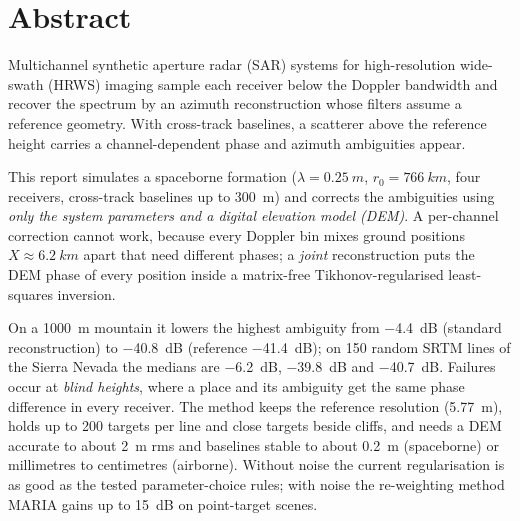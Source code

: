 \chapter*{Abstract}

Multichannel synthetic aperture radar (SAR) systems for high-resolution wide-swath (HRWS) imaging sample each receiver
below the Doppler bandwidth and recover the spectrum by an azimuth reconstruction whose filters assume a reference geometry.
With cross-track baselines, a scatterer above the reference height carries a channel-dependent phase and azimuth ambiguities
appear.

This report simulates a spaceborne formation ($\lambda=\SI{0.25}{m}$, $r_0=\SI{766}{km}$, four receivers, cross-track
baselines up to \SI{300}{m}) and corrects the ambiguities using \emph{only the system parameters and a digital elevation
model (DEM)}. A per-channel correction cannot work, because every Doppler bin mixes ground positions $X\approx\SI{6.2}{km}$
apart that need different phases; a \emph{joint} reconstruction puts the DEM phase of every position inside a matrix-free
Tikhonov-regularised least-squares inversion.

On a \SI{1000}{m} mountain it lowers the highest ambiguity from \SI{-4.4}{dB} (standard reconstruction) to \SI{-40.8}{dB}
(reference \SI{-41.4}{dB}); on 150 random SRTM lines of the Sierra Nevada the medians are \SI{-6.2}{dB}, \SI{-39.8}{dB} and
\SI{-40.7}{dB}. Failures occur at \emph{blind heights}, where a place and its ambiguity get the same phase difference in
every receiver. The method keeps the reference resolution (\SI{5.77}{m}), holds up to 200 targets per line and close targets
beside cliffs, and needs a DEM accurate to about \SI{2}{m} rms and baselines stable to about \SI{0.2}{m} (spaceborne) or
millimetres to centimetres (airborne). Without noise the current regularisation is as good as the tested parameter-choice
rules; with noise the re-weighting method MARIA gains up to \SI{15}{dB} on point-target scenes.
